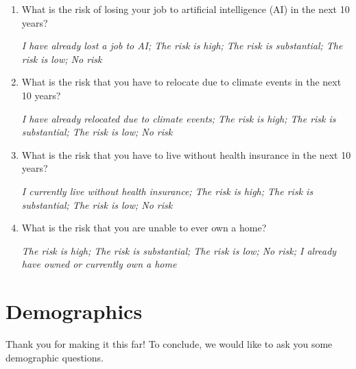 \documentclass[11pt, headsepline]{article}
\begin{document}
\begin{enumerate}[resume]

    \item What is the risk of losing your job to artificial intelligence (AI) in the next 10 years?

    \textit{I have already lost a job to AI; The risk is high; The risk is substantial; The risk is low; No risk}

    \item What is the risk that you have to relocate due to climate events in the next 10 years?

    \textit{I have already relocated due to climate events; The risk is high; The risk is substantial; The risk is low; No risk}

    \item What is the risk that you have to live without health insurance in the next 10 years?

    \textit{I currently live without health insurance; The risk is high; The risk is substantial; The risk is low; No risk}

    \item What is the risk that you are unable to ever own a home?

    \textit{The risk is high; The risk is substantial; The risk is low; No risk; I already have owned or currently own a home}

\end{enumerate}

\section*{Demographics}

Thank you for making it this far! To conclude, we would like to ask you some demographic questions.
\end{document}
